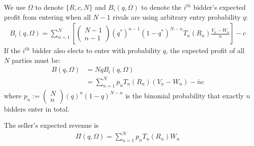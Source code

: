 \documentclass[11pt]{elegantbook}
\begin{document}
We use $\Omega$ to denote $\{R,c,N\}$ and $B_i(q,\Omega)$ to denote the $i^{th}$ bidder's expected profit from entering when all $N-1$ rivals are using arbitrary entry probability $q$:
\begin{equation}
    \begin{aligned}
        B_i(q,\Omega)=\sum_{n=1}^N\left[
            \begin{pmatrix}
            N-1\\
            n-1
        \end{pmatrix}
        (q^*)^{n-1}(1-q^*)^{N-n}T_n(R_n)\frac{V_n-W_n}{n}
        \right]-c
    \end{aligned}
    \nonumber
\end{equation}
If the $i^{th}$ bidder also elects to enter with probability $q$, the expected profit of all $N$ parties must be:
\begin{equation}
    \begin{aligned}
        B(q,\Omega)&=NqB_i(q,\Omega)\\
        &=\sum_{n=1}^N p_n T_n(R_n)(V_n-W_n)-\bar{n}c
    \end{aligned}
    \nonumber
\end{equation}
where $p_n:=\begin{pmatrix}N\\n\end{pmatrix}(q)^{n}(1-q)^{N-n}$ is the binomial probability that exactly $n$ bidders enter in total.

The seller's expected revenue is
\begin{equation}
    \begin{aligned}
        \Pi(q,\Omega)=\sum_{n=1}^N p_n T_n(R_n)W_n
    \end{aligned}
    \nonumber
\end{equation}
\end{document}
